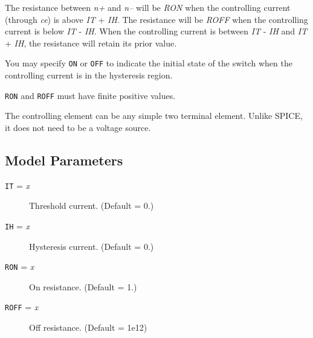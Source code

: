 The resistance between {\it n+} and {\it n--} will be {\it RON}
when the controlling current (through {\it ce}) is above {\it IT}
+ {\it IH}.  The resistance will be {\it ROFF} when the controlling
current is below {\it IT} - {\it IH}.  When the controlling current
is between {\it IT} - {\it IH} and {\it IT} + {\it IH}, the resistance
will retain its prior value.

You may specify {\tt ON} or {\tt OFF} to indicate the initial state
of the switch when the controlling current is in the hysteresis
region.

{\tt RON} and {\tt ROFF} must have finite positive values.

The controlling element can be any simple two terminal element.
Unlike SPICE, it does not need to be a voltage source.
\subsection{Model Parameters}

\begin{description}

\item[{\tt IT} = {\it x}] Threshold current.  (Default = 0.)

\item[{\tt IH} = {\it x}] Hysteresis current.  (Default = 0.)

\item[{\tt RON} = {\it x}] On resistance.  (Default = 1.)

\item[{\tt ROFF} = {\it x}] Off resistance.  (Default = 1e12)

\end{description}
